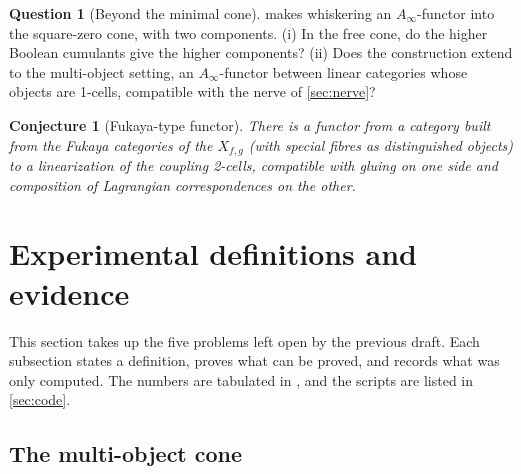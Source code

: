 \documentclass[11pt]{article}
\newtheorem{conjecture}[theorem]{Conjecture}
\theoremstyle{definition}
\newtheorem{question}[theorem]{Question}
\theoremstyle{remark}
\begin{document}
\begin{question}[Beyond the minimal cone]\label{conj:ainfty}
 makes whiskering an $A_\infty$-functor into the square-zero cone, with two components. (i) In the free cone,
do the higher Boolean cumulants give the higher components? (ii) Does the construction extend to the
multi-object setting, an $A_\infty$-functor between linear categories whose objects are 1-cells, compatible with the
nerve of \cref{sec:nerve}?
\end{question}

\begin{conjecture}[Fukaya-type functor]\label{conj:fukaya}
There is a functor from a category built from the Fukaya categories of the $X_{f,g}$ (with special
fibres as distinguished objects) to a linearization of the coupling 2-cells, compatible with gluing on
one side and composition of Lagrangian correspondences on the other.
\end{conjecture}

\section{Experimental definitions and evidence}\label{sec:experimental}

This section takes up the five problems left open by the previous draft. Each subsection states a definition,
proves what can be proved, and records what was only computed. The numbers are tabulated in
\cite[\S13]{Awasthi-Family}, and the scripts are listed in \cref{sec:code}.

\subsection{The multi-object cone}\label{sec:multicone}
\end{document}
